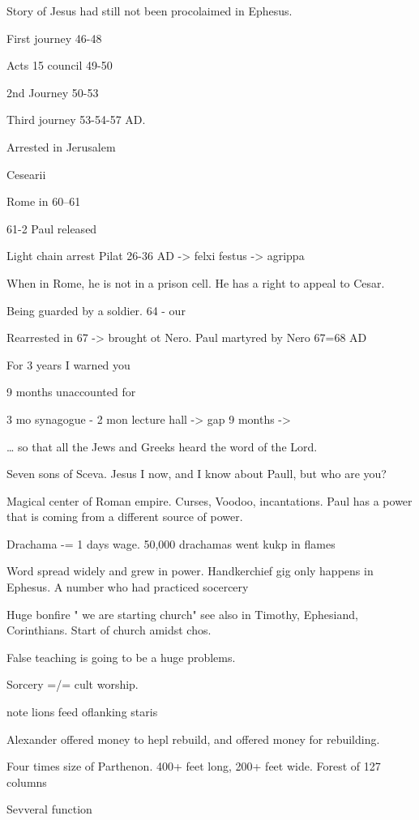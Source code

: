 \documentclass[
]{book}
\begin{document}
Story of Jesus had still not been procolaimed in Ephesus.

First journey 46-48

Acts 15 council 49-50

2nd Journey 50-53

Third journey 53-54-57 AD.

Arrested in Jerusalem

Cesearii

Rome in 60--61

61-2 Paul released

Light chain arrest Pilat 26-36 AD -\textgreater{} felxi festus -\textgreater{} agrippa

When in Rome, he is not in a prison cell. He has a right to appeal to Cesar.

Being guarded by a soldier. 64 - our

Rearrested in 67 -\textgreater{} brought ot Nero. Paul martyred by Nero 67=68 AD

For 3 years I warned you

9 months unaccounted for

3 mo synagogue - 2 mon lecture hall -\textgreater{} gap 9 months -\textgreater{}

\ldots{} so that all the Jews and Greeks heard the word of the Lord.

Seven sons of Sceva. Jesus I now, and I know about Paull, but who are you?

Magical center of Roman empire. Curses, Voodoo, incantations. Paul has a power that is coming from a different source of power.

Drachama -= 1 days wage. 50,000 drachamas went kukp in flames

Word spread widely and grew in power. Handkerchief gig only happens in Ephesus. A number who had practiced socercery

Huge bonfire " we are starting church" see also in Timothy, Ephesiand, Corinthians. Start of church amidst chos.

False teaching is going to be a huge problems.

Sorcery =/= cult worship.

note lions feed oflanking staris

Alexander offered money to hepl rebuild, and offered money for rebuilding.

Four times size of Parthenon. 400+ feet long, 200+ feet wide. Forest of 127 columns

Sevveral function
\end{document}
